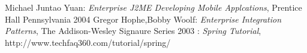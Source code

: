 \begin{thebibliography}{99}
 Michael Juntao Yuan: \emph{Enterprise J2ME Developing Mobile
Applcations}, Prentice Hall Pennsylvania 2004
 Gregor Hophe,Bobby Woolf: \emph{Enterprise Integration
Patterns}, The Addison-Wesley Signaure Series 2003
: \emph{Spring Tutorial},
http://www.techfaq360.com/tutorial/spring/
\end{thebibliography}